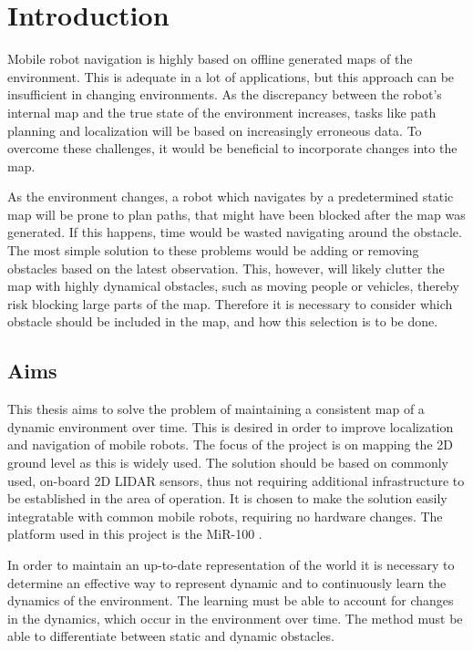 \chapter{Introduction}

Mobile robot navigation is highly based on offline generated maps of the environment. 
This is adequate in a lot of applications, but this approach can be insufficient in changing environments. 
As the discrepancy between the robot's internal map and the true state of the environment increases, tasks like path planning and localization will be based on increasingly erroneous data. 
To overcome these challenges, it would be beneficial to incorporate changes into the map.

As the environment changes, a robot which navigates by a predetermined static map will be prone to plan paths, that might have been blocked after the map was generated. 
If this happens, time would be wasted navigating around the obstacle.
The most simple solution to these problems would be adding or removing obstacles based on the latest observation. This, however, will likely clutter the map with highly dynamical obstacles, such as moving people or vehicles, thereby risk blocking large parts of the map. 
Therefore it is necessary to consider which obstacle should be included in the map, and how this selection is to be done.

\section{Aims}
This thesis aims to solve the problem of maintaining a consistent map of a dynamic environment over time. 
This is desired in order to improve localization and navigation of mobile robots. 
The focus of the project is on mapping the 2D ground level as this is widely used. 
The solution should be based on commonly used, on-board 2D LIDAR sensors, thus not requiring additional infrastructure to be established in the area of operation. 
It is chosen to make the solution easily integratable with common mobile robots, requiring no hardware changes. 
The platform used in this project is the MiR-100 \cite{mir-100-platform}.

In order to maintain an up-to-date representation of the world it is necessary to determine an effective way to represent dynamic and to continuously learn the dynamics of the environment. 
The learning must be able to account for changes in the dynamics, which occur in the environment over time. 
The method must be able to differentiate between static and dynamic obstacles.

